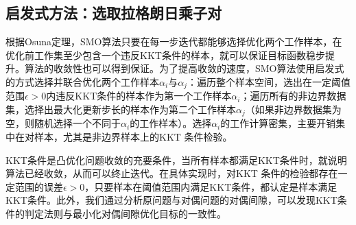 \subsection{启发式方法：选取拉格朗日乘子对}
根据Osuna定理\cite{osuna1997improved}，SMO算法只要在每一步迭代都能够选择优化两个工作样本，在优化前工作集至少包含一个违反KKT条件的样本，就可以保证目标函数稳步提升。算法的收敛性也可以得到保证。为了提高收敛的速度，SMO算法使用启发式的方式选择并联合优化两个工作样本$\alpha_i$与$\alpha_j$：遍历整个样本空间，选出在一定阈值范围$\epsilon>0$内违反KKT条件的样本作为第一个工作样本$\alpha_i$；遍历所有的非边界数据集，选择出最大化更新步长的样本作为第二个工作样本$\alpha_j$（如果非边界数据集为空，则随机选择一个不同于$\alpha_i$的工作样本）。选择$\alpha_i$的工作计算密集，主要开销集中在对样本，尤其是非边界样本上的KKT 条件检验。

KKT条件是凸优化问题收敛的充要条件，当所有样本都满足KKT条件时，就说明算法已经收敛，从而可以终止迭代。在具体实现时，对KKT 条件的检验都存在一定范围的误差$\epsilon>0$，只要样本在阈值范围内满足KKT条件，都认定是样本满足KKT条件。此外，我们通过分析原问题与对偶问题的对偶间隙，可以发现KKT条件的判定法则与最小化对偶间隙优化目标的一致性。

